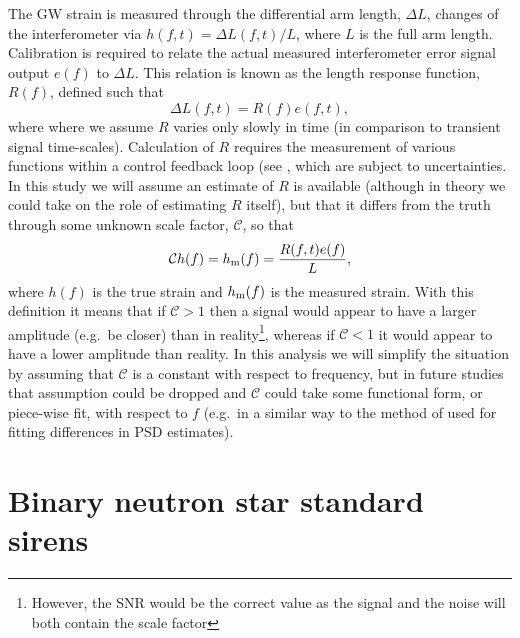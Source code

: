\documentclass[10pt]{iopart}
\newcommand{\scf}{\ensuremath{\mathcal{C}}}
\begin{document}
The \ac{GW} strain is measured through the differential arm length, $\Delta L$, changes of the 
interferometer via $h(f,t) = \Delta L(f,t) / L$, where $L$ is the full arm length. Calibration is 
required to relate the actual measured interferometer error signal output $e(f)$ to $\Delta L$. 
This relation is known as the length response function, $R(f)$, defined such that
\begin{equation}
\Delta L(f,t) = R(f) e(f, t),
\end{equation}
where where we assume $R$ varies only slowly in time (in comparison to transient signal 
time-scales). Calculation of $R$ requires the measurement of various functions within a control 
feedback loop (see \cite{2010NIMPA.624..223A}, which are subject to uncertainties. In this 
study we will assume an estimate of $R$ is available (although in theory we could take on the role 
of estimating $R$ itself), but that it differs from the truth through some unknown scale factor, 
$\scf$, so that
\begin{equation}\label{eq:scalefactor}
\scf h(f) = h_{\rm m}(f) = \frac{R(f,t) e(f)}{L},
\end{equation}
where $h(f)$ is the true strain and $h_{\rm m}(f)$ is the measured strain. With this definition it
means that if $\scf > 1$ then a signal would appear to have a larger amplitude (e.g.\ be 
closer) than in reality\footnote{However, the \ac{SNR} would be the correct value as the signal and 
the noise will both contain the scale factor}, whereas if $\scf < 1$ it would appear to have a 
lower amplitude than reality. In this analysis we will simplify the situation by assuming that 
$\scf$ is a constant with respect to frequency, but in future studies that assumption could be 
dropped and $\scf$ could take some functional form, or piece-wise fit, with respect to $f$ (e.g.\ 
in a similar way to the method of \cite{2013PhRvD..88h4044L} used for fitting differences in 
\ac{PSD} estimates).

\section{Binary neutron star standard sirens\label{sec:sirens}}
\end{document}

